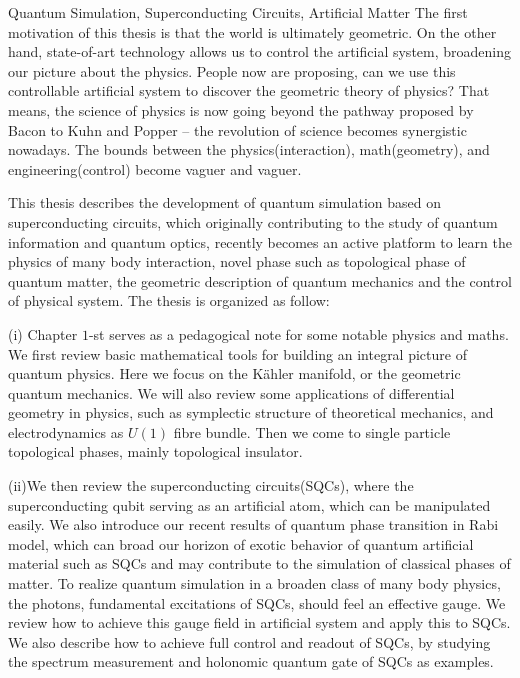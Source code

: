 \documentclass[supercite]{HustGraduPaper}
\begin{document}
	\begin{enabstract}{Quantum Simulation, Superconducting Circuits, Artificial Matter}
	The first motivation of this thesis is that the world is ultimately geometric\cite{weinberg1994dreams}. On the other hand, state-of-art technology allows us to control the artificial system, broadening our picture about the physics\cite{GU20171}. People now are proposing, can we use this controllable artificial system to discover the geometric theory of physics? That means, the science of physics is now going beyond the pathway proposed by Bacon to Kuhn and Popper\cite{popper2005logic,kuhn2012structure,descartes1987discours,bacon1878novum} – the revolution of science becomes synergistic nowadays. The bounds between the physics(interaction), math(geometry), and engineering(control) become vaguer and vaguer. 
	
	This thesis describes the development of quantum simulation based on superconducting circuits, which originally contributing to the study of quantum information and quantum optics, recently becomes an active platform to learn the physics of many body interaction, novel phase such as topological phase of quantum matter, the geometric description of quantum mechanics and the control of physical system. The thesis is organized as follow:
	
	 (i) Chapter $1$-st serves as a pedagogical note for some notable physics and maths. We first review basic mathematical tools for building an integral picture of quantum physics. Here we focus on the Kähler manifold, or the geometric quantum mechanics. We will also review some applications of differential geometry in physics, such as symplectic structure of theoretical mechanics, and electrodynamics as $U(1)$ fibre bundle. Then we come to single particle topological phases, mainly topological insulator.
	 
	 (ii)We then review the superconducting circuits(SQCs), where the superconducting qubit serving as an artificial atom, which can be manipulated easily. We also introduce our recent results of quantum phase transition in Rabi model, which can broad our horizon of exotic behavior of quantum artificial material such as SQCs and may contribute to the simulation of classical phases of matter. To realize quantum simulation in a broaden class of many body physics, the photons, fundamental excitations of SQCs, should feel an effective gauge. We review how to achieve this gauge field in artificial system and apply this to SQCs. We also describe how to achieve full control and readout of SQCs, by studying the spectrum measurement and holonomic quantum gate of SQCs as examples. 
	 

\end{enabstract}
\end{document}
